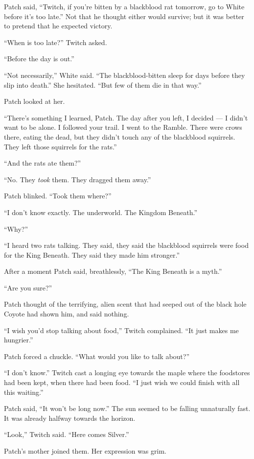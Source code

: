 \documentclass[ebook,oneside,openany,12pt]{memoir}
\begin{document}
Patch said, “Twitch, if you’re bitten by a blackblood rat tomorrow, go
to White before it’s too late.” Not that he thought either would
survive; but it was better to pretend that he expected victory.

“When is too late?” Twitch asked.

“Before the day is out.”

“Not necessarily,” White said. “The blackblood-bitten sleep for days
before they slip into death.” She hesitated. “But few of them die in
that way.”

Patch looked at her.

“There’s something I learned, Patch. The day after you left, I decided
— I didn’t want to be alone. I followed your trail. I went to the
Ramble. There were crows there, eating the dead, but they didn’t touch
any of the blackblood squirrels. They left those squirrels for the
rats.”

“And the rats ate them?”

“No. They \emph{took} them. They dragged them away.”

Patch blinked. “Took them where?”

“I don’t know exactly. The underworld. The Kingdom Beneath.”

“Why?”

“I heard two rats talking. They said, they said the blackblood
squirrels were food for the King Beneath. They said they made him
stronger.”

After a moment Patch said, breathlessly, “The King Beneath is a myth.”

“Are you sure?”

Patch thought of the terrifying, alien scent that had seeped out of
the black hole Coyote had shown him, and said nothing.

“I wish you’d stop talking about food,” Twitch complained. “It just
makes me hungrier.”

Patch forced a chuckle. “What would you like to talk about?”

“I don’t know.” Twitch cast a longing eye towards the maple where the
foodstores had been kept, when there had been food. “I just wish we
could finish with all this waiting.”

Patch said, “It won’t be long now.” The sun seemed to be falling
unnaturally fast. It was already halfway towards the horizon.

“Look,” Twitch said. “Here comes Silver.”

Patch’s mother joined them. Her expression was grim.
\end{document}
